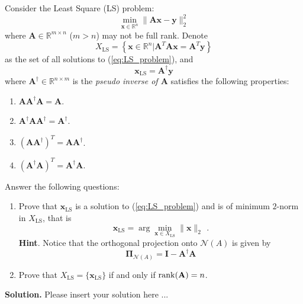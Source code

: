 \documentclass[english,onecolumn]{IEEEtran}
\begin{document}
Consider the Least Square (LS) problem:
\begin{equation}
    \label{eq:LS_problem}
    \min_{\mathbf{x}\in\mathbb{R}^n}\|\mathbf{A}\mathbf{x}-\mathbf{y}\|_2^2
\end{equation}
where $\mathbf{A}\in\mathbb{R}^{m\times n}$ ($m>n$) may not be full rank. Denote 
\begin{equation*}
    X_{\mathrm{LS}}=\left\{\mathbf{x}\in\mathbb{R}^n| \mathbf{A}^T\mathbf{A}\mathbf{x}=\mathbf{A}^T\mathbf{y}\right\}
\end{equation*}
as the set of all solutions to (\ref{eq:LS_problem}), and 
\begin{equation*}
    \mathbf{x}_{\mathrm{LS}}=\mathbf{A}^\dagger \mathbf{y}
\end{equation*}
where $\mathbf{A}^\dagger\in\mathbb{R}^{n\times m}$ is the \emph{pseudo inverse of $\mathbf{A}$} satisfies the following properties:
\begin{enumerate}
    \item $\mathbf{A}\mathbf{A}^\dagger\mathbf{A}=\mathbf{A}$.
    \item $\mathbf{A}^\dagger\mathbf{A}\mathbf{A}^\dagger=\mathbf{A}^\dagger$.
    \item $(\mathbf{A}\mathbf{A}^\dagger)^T=\mathbf{A}\mathbf{A}^\dagger$.
    \item $(\mathbf{A}^\dagger\mathbf{A})^T=\mathbf{A}^\dagger\mathbf{A}$.
\end{enumerate}

Answer the following questions:
\begin{enumerate}
    \item Prove that $\mathbf{x}_{\mathrm{LS}}$ is a solution to (\ref{eq:LS_problem}) and is of minimum $2$-norm in $X_{\mathrm{LS}}$, that is
    \begin{equation*}
        \mathbf{x}_{\mathrm{LS}}=\arg\min_{\mathbf{x}\in X_{\mathrm{LS}}}\|\mathbf{x}\|_2\  \,.
    \end{equation*}
    \textbf{Hint}. Notice that the orthogonal projection onto $\mathcal{N}(A)$ is given by
    \begin{equation*}
        \mathbf{\Pi}_{\mathcal{N}(A)}=\mathbf{I}-\mathbf{A}^\dagger\mathbf{A}
    \end{equation*}
    
    \item Prove that $X_{\mathrm{LS}}=\{\mathbf{x}_{\mathrm{LS}}\}$ if and only if $\mathrm{rank}({\bf A})=n$.
\end{enumerate}

\noindent
\textbf{Solution.}
Please insert your solution here ...
\end{document}
